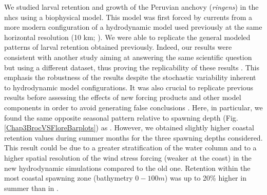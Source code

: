 We studied larval retention and growth of the Peruvian anchovy (\textit{\gls{ringens}}) in the \acrshort{nhcs} using a biophysical model. This model was first forced by currents from a more modern configuration of a hydrodynamic model used previously at the same horizontal resolution (10 km; \cite{BrocLett2008}). We were able to replicate the general modeled patterns of larval retention obtained previously. Indeed, our results were consistent with another study aiming at answering the same scientific question but using a different dataset, thus proving the replicability of these results \citep{NAP25303}. This emphasis the robustness of the results despite the stochastic variability inherent to hydrodynamic model configurations. It was also crucial to replicate previous results before assessing the effects of new forcing products and other model components in order to avoid generating false conclusions \citep{Bake2016}. Here, in particular, we found the same opposite seasonal pattern relative to spawning depth (Fig. \ref{Chap3BrocVSFloreBarplots}) as \cite{BrocLett2008}. However, we obtained slightly higher coastal retention values during summer months for the three spawning depths considered. This result could be due to a greater stratification of the water column and to a higher spatial resolution of the wind stress forcing (weaker at the coast) in the new hydrodynamic simulations compared to the old one. Retention within the most coastal spawning zone (bathymetry $0 -100 m$) was up to 20\% higher in summer than in \cite{BrocLett2008}.\\


